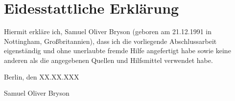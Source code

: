 \chapter*{Eidesstattliche Erkl\"arung}

Hiermit erkl\"are ich, Samuel Oliver Bryson (geboren am 21.12.1991 in Nottingham, Gro\ss{}britannien), dass ich die vorliegende Abschlussarbeit eigenst\"andig und ohne unerlaubte fremde Hilfe angefertigt habe sowie keine anderen als die angegebenen Quellen und Hilfsmittel verwendet habe.

\vspace{2cm}

\begin{flushright}
	Berlin, den XX.XX.XXX \hspace{1cm} \underline{\hspace{7cm}}

	Samuel Oliver Bryson \hspace{1.5cm} \par
\end{flushright}
